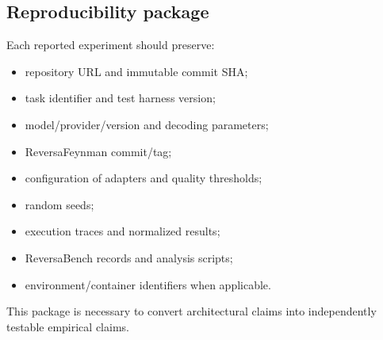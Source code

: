 \subsection{Reproducibility package}

Each reported experiment should preserve:

\begin{itemize}
  \item repository URL and immutable commit SHA;
  \item task identifier and test harness version;
  \item model/provider/version and decoding parameters;
  \item ReversaFeynman commit/tag;
  \item configuration of adapters and quality thresholds;
  \item random seeds;
  \item execution traces and normalized results;
  \item ReversaBench records and analysis scripts;
  \item environment/container identifiers when applicable.
\end{itemize}

This package is necessary to convert architectural claims into independently testable empirical claims.